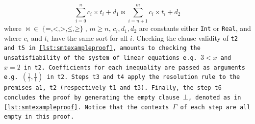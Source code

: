 \begin{equation}
\sum_{i=0}^{n}c_i\times{}t_i + d_1\bowtie \sum_{i=n+1}^{m} c_i\times{}t_i + d_2
\label{eqn:inequality}
\end{equation}
%
where $\mathop{\bowtie} \mathrel{\in} \mathop{\{=, <, >, \leq, \geq\}}$, $m\geq n$, $c_i, d_1, d_2$ are constants either \lstinline[language=SMT,basicstyle=\ttfamily\footnotesize]{Int} or \lstinline[language=SMT,basicstyle=\ttfamily\footnotesize]{Real},
and where $c_i$ and $t_i$ have the same sort for all $i$.
Checking the clause validity of \tt{t2} and \tt{t5} in \cref{lst:smtexampleproof}, amounts to checking the unsatisfiability of the system of linear equations e.g. $3 < x$ and $x = 2$ in \tt{t2}.
Coefficients for each inequality are passed as arguments e.g. $(\frac{1}{1},\frac{1}{1})$ in \tt{t2}.
Steps \tt{t3} and \tt{t4} apply the \colorbox{rxpurple2!30}{\texttt{resolution}} rule to the premises \tt{a1}, \tt{t2} (respectively \tt{t1} and \tt{t3}).
Finally, the step \texttt{t6} concludes the proof by generating the empty clause $\bot$, denoted as  in \cref{lst:smtexampleproof}.
Notice that the contexts \colorbox{RoyalBlue!30}{$\Gamma$} of each step are all empty in this proof.

